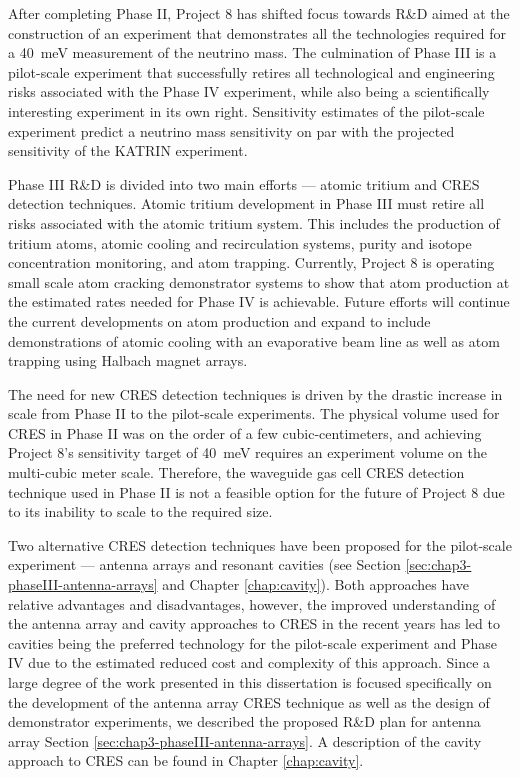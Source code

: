After completing Phase II, Project 8 has shifted focus towards R\&D aimed at the construction of an experiment that demonstrates all the technologies required for a 40~meV measurement of the neutrino mass. The culmination of Phase III is a pilot-scale experiment that successfully retires all technological and engineering risks associated with the Phase IV experiment, while also being a scientifically interesting experiment in its own right. Sensitivity estimates of the pilot-scale experiment predict a neutrino mass sensitivity on par with the projected sensitivity of the KATRIN experiment. 

Phase III R\&D is divided into two main efforts --- atomic tritium and CRES detection techniques. Atomic tritium development in Phase III must retire all risks associated with the atomic tritium system. This includes the production of tritium atoms, atomic cooling and recirculation systems, purity and isotope concentration monitoring, and atom trapping. Currently, Project 8 is operating small scale atom cracking demonstrator systems to show that atom production at the estimated rates needed for Phase IV is achievable. Future efforts will continue the current developments on atom production and expand to include demonstrations of atomic cooling with an evaporative beam line as well as atom trapping using Halbach magnet arrays.

The need for new CRES detection techniques is driven by the drastic increase in scale from Phase II to the pilot-scale experiments. The physical volume used for CRES in Phase II was on the order of a few cubic-centimeters, and achieving Project 8's sensitivity target of 40~meV requires an experiment volume on the multi-cubic meter scale. Therefore, the waveguide gas cell CRES detection technique used in Phase II is not a feasible option for the future of Project 8 due to its inability to scale to the required size.

Two alternative CRES detection techniques have been proposed for the pilot-scale experiment --- antenna arrays and resonant cavities (see Section \ref{sec:chap3-phaseIII-antenna-arrays} and Chapter \ref{chap:cavity}). Both approaches have relative advantages and disadvantages, however, the improved understanding of the antenna array and cavity approaches to CRES in the recent years has led to cavities being the preferred technology for the pilot-scale experiment and Phase IV due to the estimated reduced cost and complexity of this approach. Since a large degree of the work presented in this dissertation is focused specifically on the development of the antenna array CRES technique as well as the design of demonstrator experiments, we described the proposed R\&D plan for antenna array Section \ref{sec:chap3-phaseIII-antenna-arrays}. A description of the cavity approach to CRES can be found in Chapter \ref{chap:cavity}.

